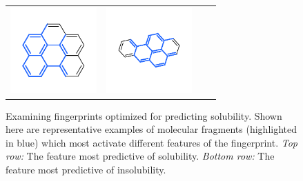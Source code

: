 \documentclass{article}
\begin{document}
\begin{figure}[h]
\begin{tabular}{>{\centering}m{1.1in} >{\centering}m{3.1cm} >{\centering}m{3.1cm} >{\centering\arraybackslash}m{3.1cm}}
\includegraphics[width=3.3cm, clip, trim = 2mm 3mm 2mm 6mm]{fig_9.pdf}\vspace{-1em} &
\includegraphics[width=3.3cm, clip, trim = 2mm 3mm 2mm 6mm]{fig_10.pdf}\vspace{-1em} \\
\end{tabular}
\caption{Examining fingerprints optimized for predicting solubility.
Shown here are representative examples of molecular fragments (highlighted in blue) which most activate different features of the fingerprint.
\emph{Top row:} The feature most predictive of solubility.
\emph{Bottom row:} The feature most predictive of insolubility.
}
\label{fig:learned features solubility}
\end{figure}
\end{document}
